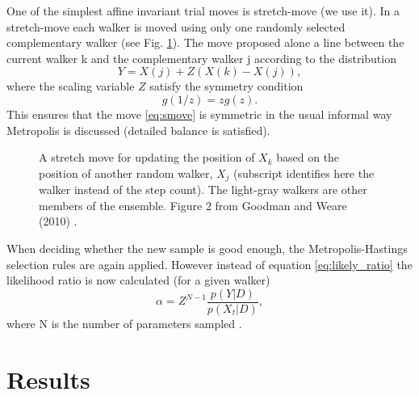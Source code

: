 \documentclass{wihuri}
\def\be{\begin{equation}}
\def\ee{\end{equation}}
\begin{document}



One of the simplest affine invariant trial moves is stretch-move (we use it). In a stretch-move each walker is moved using only one randomly selected complementary walker (see Fig. \ref{fig:smove}). The move proposed alone a line between the current walker k and the complementary walker j according to the distribution
\be \label{eq:smove}
Y = X(j) + Z(X(k)-X(j)),
\ee
where the scaling variable $Z$ satisfy the symmetry condition
\be \label{eq:symmetry_condition}
g(1/z) = zg(z).
\ee
This ensures that the move \ref{eq:smove} is symmetric in the usual informal way Metropolis is discussed (detailed balance is satisfied).


\begin{figure}
\centerline{}
\caption{A stretch move for updating the position of $X_{k}$ based on the position of another random walker, $X_{j}$ (subscript identifies here the walker instead of the step count). The light-gray walkers are other members of the ensemble. Figure 2 from Goodman and Weare (2010) \cite{ensemble1}.
\label{fig:smove}}
\end{figure}


When deciding whether the new sample is good enough, the Metropolis-Hastings selection rules are again applied. However instead of equation \ref{eq:likely_ratio} the likelihood ratio is now calculated (for a given walker)
\be \label{eq:likely_ratio_smove} 
\alpha = Z^{N-1}\frac{p(Y|D)}{p(X_{t}|D)},
\ee
where N is the number of parameters sampled \cite{ensemble1}. 




\section{Results}
\end{document}
